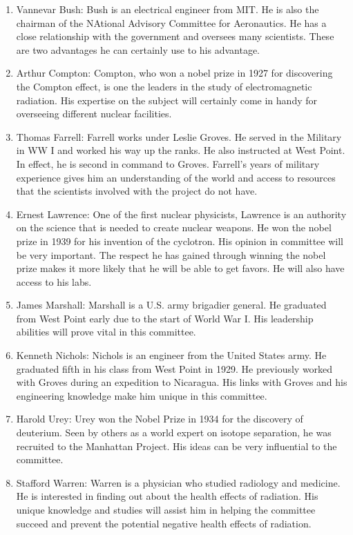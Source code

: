 \documentclass[11 pt, twoside]{article}
\begin{document}
\begin{enumerate}
\item Vannevar Bush: Bush is an electrical engineer from MIT. He is also the chairman of the NAtional Advisory Committee for Aeronautics. He has a close relationship with the government and oversees many scientists. These are two advantages he can certainly use to his advantage.
\item Arthur Compton: Compton, who won a nobel prize in 1927 for discovering the Compton effect, is one  the leaders in the study of electromagnetic radiation. His expertise on the subject will certainly come in handy for overseeing different nuclear facilities.
\item Thomas Farrell: Farrell works under Leslie Groves. He served in the Military in WW I and worked his way up the ranks. He also instructed at West Point. In effect, he is second in command to Groves. Farrell’s years of military experience gives him an understanding of the world and access to resources that the scientists involved with the project do not have. 
\item Ernest Lawrence: One of the first nuclear physicists, Lawrence is an authority on the science that is needed to create nuclear weapons. He won the nobel prize in 1939 for his invention of the cyclotron. His opinion in committee will be very important. The respect he has gained through winning the nobel prize makes it more likely that he will be able to get favors. He will also have access to his labs.
\item James Marshall: Marshall is a U.S. army brigadier general. He graduated from West Point early due to the start of World War I. His leadership abilities will prove vital in this committee.
\item Kenneth Nichols: Nichols is an engineer from the United States army. He graduated fifth in his class from West Point in 1929. He previously worked with Groves during an expedition to Nicaragua. His links with Groves and his engineering knowledge make him unique in this committee.  
\item Harold Urey: Urey won the Nobel Prize in 1934 for the discovery of deuterium. Seen by others as a world expert on isotope separation, he was recruited to the Manhattan Project. His ideas can be very influential to the committee.
\item Stafford Warren: Warren is a physician who studied radiology and medicine. He is interested in   finding out about the health effects of radiation. His unique knowledge and studies will assist him in helping the committee succeed and prevent the potential negative health effects of radiation.

\end{enumerate}
\end{document}
